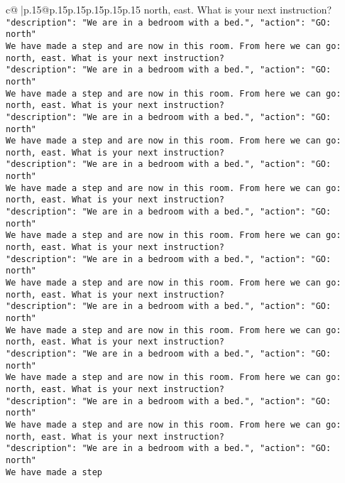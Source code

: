 \documentclass{article}
\begin{document}
{\begin{supertabular}{c@{$\;$}|p{.15\linewidth}@{}p{.15\linewidth}p{.15\linewidth}p{.15\linewidth}p{.15\linewidth}p{.15\linewidth}}
{{{north, east. What is your next instruction?\\ \tt {"description": "We are in a bedroom with a bed.", "action": "GO: north"}\\ \tt We have made a step and are now in this room. From here we can go: north, east. What is your next instruction?\\ \tt {"description": "We are in a bedroom with a bed.", "action": "GO: north"}\\ \tt We have made a step and are now in this room. From here we can go: north, east. What is your next instruction?\\ \tt {"description": "We are in a bedroom with a bed.", "action": "GO: north"}\\ \tt We have made a step and are now in this room. From here we can go: north, east. What is your next instruction?\\ \tt {"description": "We are in a bedroom with a bed.", "action": "GO: north"}\\ \tt We have made a step and are now in this room. From here we can go: north, east. What is your next instruction?\\ \tt {"description": "We are in a bedroom with a bed.", "action": "GO: north"}\\ \tt We have made a step and are now in this room. From here we can go: north, east. What is your next instruction?\\ \tt {"description": "We are in a bedroom with a bed.", "action": "GO: north"}\\ \tt We have made a step and are now in this room. From here we can go: north, east. What is your next instruction?\\ \tt {"description": "We are in a bedroom with a bed.", "action": "GO: north"}\\ \tt We have made a step and are now in this room. From here we can go: north, east. What is your next instruction?\\ \tt {"description": "We are in a bedroom with a bed.", "action": "GO: north"}\\ \tt We have made a step and are now in this room. From here we can go: north, east. What is your next instruction?\\ \tt {"description": "We are in a bedroom with a bed.", "action": "GO: north"}\\ \tt We have made a step and are now in this room. From here we can go: north, east. What is your next instruction?\\ \tt {"description": "We are in a bedroom with a bed.", "action": "GO: north"}\\ \tt We have made a step 
	  } 
	   } 
	   } 
	  \\ 
 


\end{supertabular}}
\end{document}
